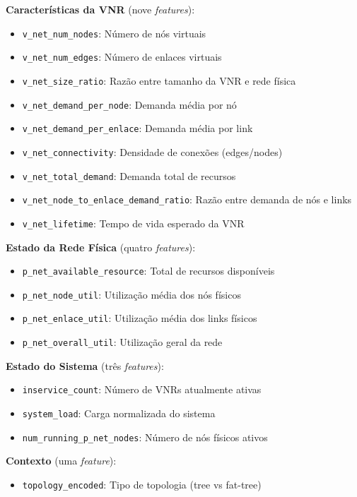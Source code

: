 \documentclass[conference]{IEEEtran}
\begin{document}
\textbf{Características da VNR} (nove \textit{features}):
\begin{itemize}
    \item \texttt{v\_net\_num\_nodes}: Número de nós virtuais
    \item \texttt{v\_net\_num\_edges}: Número de enlaces virtuais
    \item \texttt{v\_net\_size\_ratio}: Razão entre tamanho da VNR e rede física
    \item \texttt{v\_net\_demand\_per\_node}: Demanda média por nó
    \item \texttt{v\_net\_demand\_per\_enlace}: Demanda média por link
    \item \texttt{v\_net\_connectivity}: Densidade de conexões (edges/nodes)
    \item \texttt{v\_net\_total\_demand}: Demanda total de recursos
    \item \texttt{v\_net\_node\_to\_enlace\_demand\_ratio}: Razão entre demanda de nós e links
    \item \texttt{v\_net\_lifetime}: Tempo de vida esperado da VNR
\end{itemize}

\textbf{Estado da Rede Física} (quatro \textit{features}):
\begin{itemize}
    \item \texttt{p\_net\_available\_resource}: Total de recursos disponíveis
    \item \texttt{p\_net\_node\_util}: Utilização média dos nós físicos
    \item \texttt{p\_net\_enlace\_util}: Utilização média dos links físicos
    \item \texttt{p\_net\_overall\_util}: Utilização geral da rede
\end{itemize}

\textbf{Estado do Sistema} (três \textit{features}):
\begin{itemize}
    \item \texttt{inservice\_count}: Número de VNRs atualmente ativas
    \item \texttt{system\_load}: Carga normalizada do sistema
    \item \texttt{num\_running\_p\_net\_nodes}: Número de nós físicos ativos
\end{itemize}

\textbf{Contexto} (uma \textit{feature}):
\begin{itemize}
    \item \texttt{topology\_encoded}: Tipo de topologia (tree vs fat-tree)
\end{itemize}
\end{document}
